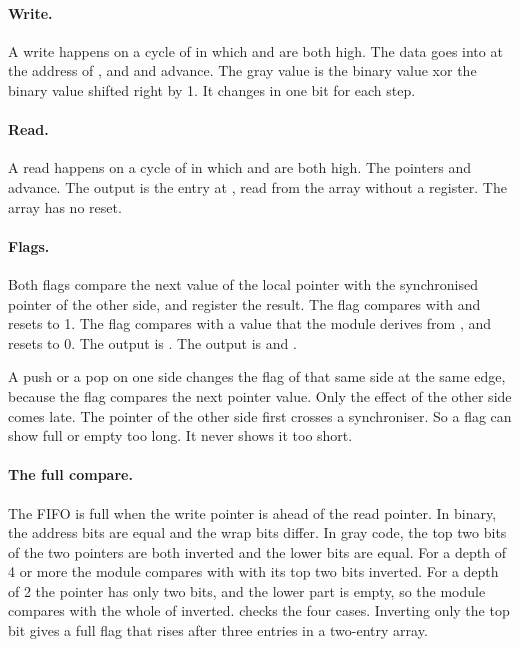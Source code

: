 \paragraph{Write.} A write happens on a cycle of  in which  and  are both high. The data goes into  at the address of , and  and  advance. The gray value is the binary value xor the binary value shifted right by 1. It changes in one bit for each step.

\paragraph{Read.} A read happens on a cycle of  in which  and  are both high. The pointers  and  advance. The output  is the entry at , read from the array without a register. The array has no reset.

\paragraph{Flags.} Both flags compare the next value of the local pointer with the synchronised pointer of the other side, and register the result. The flag  compares  with  and resets to 1. The flag  compares  with a value that the module derives from , and resets to 0. The output  is . The output  is  and .

A push or a pop on one side changes the flag of that same side at the same edge, because the flag compares the next pointer value. Only the effect of the other side comes late. The pointer of the other side first crosses a synchroniser. So a flag can show full or empty too long. It never shows it too short.

\paragraph{The full compare.} The FIFO is full when the write pointer is  ahead of the read pointer. In binary, the address bits are equal and the wrap bits differ. In gray code, the top two bits of the two pointers are both inverted and the lower bits are equal. For a depth of 4 or more the module compares  with  with its top two bits inverted. For a depth of 2 the pointer has only two bits, and the lower part is empty, so the module compares with the whole of  inverted.  checks the four cases. Inverting only the top bit gives a full flag that rises after three entries in a two-entry array.

